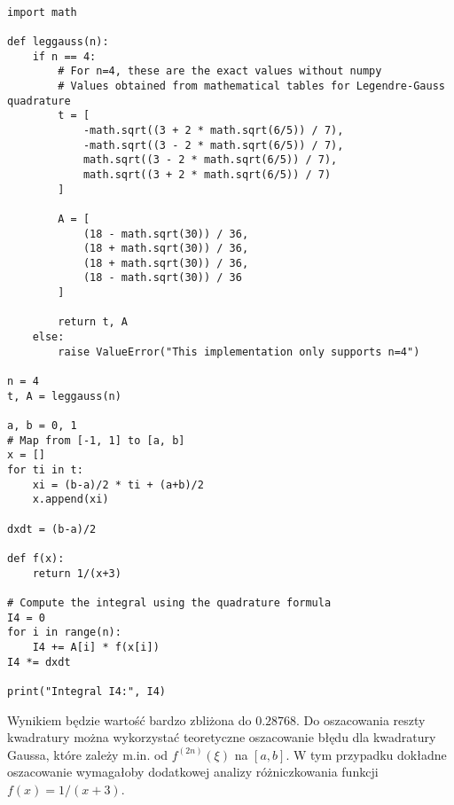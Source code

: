 \documentclass[a4paper,12pt]{article}
\begin{document}
\begin{lstlisting}[caption={Obliczenie całki \(I_4\) metodą Gaussa-Legendre'a}, label=lst:gauss]

import math

def leggauss(n):
    if n == 4:
        # For n=4, these are the exact values without numpy
        # Values obtained from mathematical tables for Legendre-Gauss quadrature
        t = [
            -math.sqrt((3 + 2 * math.sqrt(6/5)) / 7),
            -math.sqrt((3 - 2 * math.sqrt(6/5)) / 7),
            math.sqrt((3 - 2 * math.sqrt(6/5)) / 7),
            math.sqrt((3 + 2 * math.sqrt(6/5)) / 7)
        ]
        
        A = [
            (18 - math.sqrt(30)) / 36,
            (18 + math.sqrt(30)) / 36,
            (18 + math.sqrt(30)) / 36,
            (18 - math.sqrt(30)) / 36
        ]
        
        return t, A
    else:
        raise ValueError("This implementation only supports n=4")

n = 4
t, A = leggauss(n)

a, b = 0, 1
# Map from [-1, 1] to [a, b]
x = []
for ti in t:
    xi = (b-a)/2 * ti + (a+b)/2
    x.append(xi)
    
dxdt = (b-a)/2

def f(x):
    return 1/(x+3)

# Compute the integral using the quadrature formula
I4 = 0
for i in range(n):
    I4 += A[i] * f(x[i])
I4 *= dxdt

print("Integral I4:", I4)
\end{lstlisting}

Wynikiem będzie wartość bardzo zbliżona do \(0.28768\). Do oszacowania reszty kwadratury można wykorzystać teoretyczne oszacowanie błędu dla kwadratury Gaussa, które zależy m.in. od \(f^{(2n)}(\xi)\) na \([a,b]\). W tym przypadku dokładne oszacowanie wymagałoby dodatkowej analizy różniczkowania funkcji \(f(x)=1/(x+3)\).
\newpage
\end{document}
